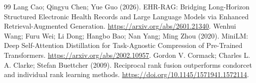 \documentclass{article}
\begin{document}
\begin{thebibliography}{99}
 Lang Cao; Qingyu Chen; Yue Guo (2026). EHR-RAG: Bridging Long-Horizon Structured Electronic Health Records and Large Language Models via Enhanced Retrieval-Augmented Generation. \url{https://arxiv.org/abs/2601.21340}.
 Wenhui Wang; Furu Wei; Li Dong; Hangbo Bao; Nan Yang; Ming Zhou (2020). MiniLM: Deep Self-Attention Distillation for Task-Agnostic Compression of Pre-Trained Transformers. \url{https://arxiv.org/abs/2002.10957}.
 Gordon V. Cormack; Charles L. A. Clarke; Stefan Buettcher (2009). Reciprocal rank fusion outperforms condorcet and individual rank learning methods. \url{https://doi.org/10.1145/1571941.1572114}.
\end{thebibliography}
\end{document}
